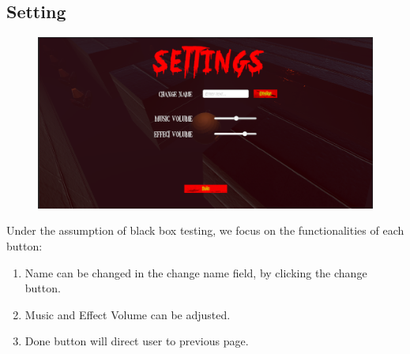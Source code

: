 \documentclass[11pt]{article}
\begin{document}
    \subsection{Setting}

    \begin{figure}[H]
        \centering
        \includegraphics*[scale=0.4]{Setting.png}
    \end{figure}

    Under the assumption of black box testing, we focus on the functionalities of each button:

    \begin{enumerate}
        \item Name can be changed in the change name field, by clicking the change button.
        \item Music and Effect Volume can be adjusted.
        \item Done button will direct user to previous page.
    \end{enumerate}
\end{document}
